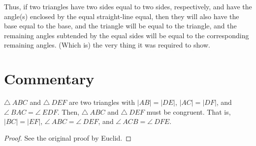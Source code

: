 Thus, if two triangles have two  sides equal to two sides, respectively, and have the
angle(s) enclosed by the equal straight-line equal, then
they will also have the base equal to the base, and the triangle will be equal
to the triangle,  and
the remaining angles subtended by the equal sides will be equal to the
corresponding remaining angles. (Which is) the very thing it was required to show.


\section*{Commentary}

\begin{proposition}\label{proposition_4}\leanok
    $\triangle~ABC$ and $\triangle~DEF$ are two triangles with $|AB| = |DE|$, $|AC| = |DF|$, and $\angle~BAC = \angle~EDF$. Then, $\triangle~ABC$ and $\triangle~DEF$ must be congruent. That is, $|BC| = |EF|$, $\angle~ABC = \angle~DEF$, and $\angle~ACB = \angle~DFE$.
\end{proposition}
\begin{proof}
    \leanok
    See the original proof by Euclid.
\end{proof}

